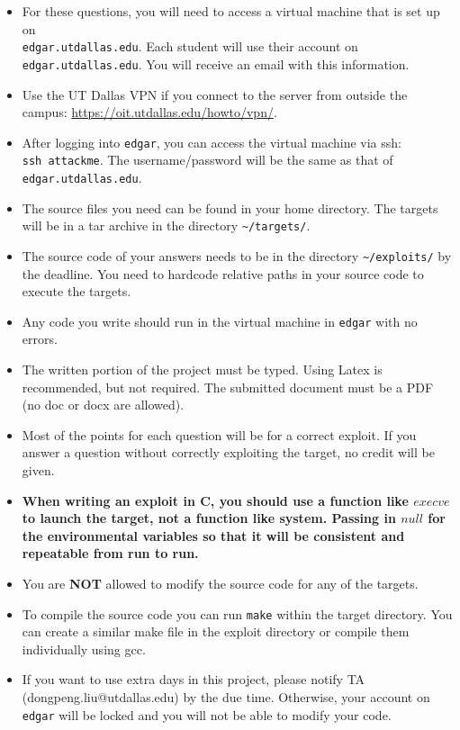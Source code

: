 \documentclass[11pt]{article}
\begin{document}
\begin{itemize}
	\item For these questions, you will need to access a virtual machine that is set up on\\
    \verb"edgar.utdallas.edu". Each student will use their account on \verb"edgar.utdallas.edu". You will receive an email with this information.
    \item Use the UT Dallas VPN if you connect to the server from outside the campus: \url{https://oit.utdallas.edu/howto/vpn/}.
    \item After logging into \verb"edgar", you can access the virtual machine via ssh:\\ \verb"ssh attackme". The username/password will be the same as that of \verb"edgar.utdallas.edu".
	\item The source files you need can be found in your home directory. The targets will be in a tar archive in the directory \verb"~/targets/". 
	\item The source code of your answers needs to be in the directory \verb"~/exploits/" by the deadline. You need to hardcode relative paths in your source code to execute the targets.
	\item Any code you write should run in the virtual machine in \verb"edgar" with no errors.
	\item The written portion of the project must be typed. Using Latex is recommended, but not required. The submitted document must be a PDF (no doc or docx are allowed).
	\item Most of the points for each question will be for a correct exploit. If you answer a question without correctly exploiting the target, no credit will be given.
	\item \textbf{When writing an exploit in C, you should use a function like $execve$ to launch the target, not a function like system.  Passing in $null$ for the environmental variables so that it will be consistent and repeatable from run to run.}
	\item You are \textbf{NOT} allowed to modify the source code for any of the targets.
    \item To compile the source code you can run \verb"make" within the target directory. You can create a similar make file in the exploit directory or compile them individually using gcc.
    \item If you want to use extra days in this project, please notify TA (dongpeng.liu@utdallas.edu) by the due time. Otherwise, your account on \verb"edgar" will be locked and you will not be able to modify your code.


\end{itemize}
\end{document}
